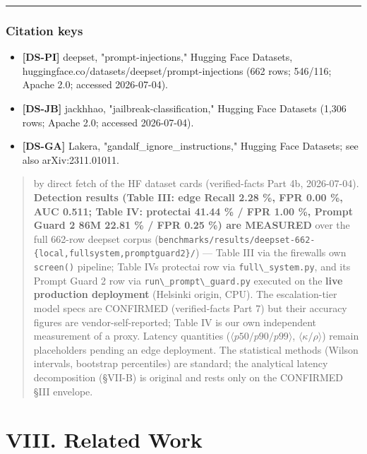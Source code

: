 \begin{center}\rule{0.5\linewidth}{0.5pt}\end{center}

\subsubsection{Citation keys}\label{citation-keys-4}

\begin{itemize}
\tightlist
\item
  \textbf{{[}DS-PI{]}} deepset, "prompt-injections," Hugging Face
  Datasets, huggingface.co/datasets/deepset/prompt-injections (662 rows;
  546/116; Apache 2.0; accessed 2026-07-04).
\item
  \textbf{{[}DS-JB{]}} jackhhao, "jailbreak-classification," Hugging
  Face Datasets (1,306 rows; Apache 2.0; accessed 2026-07-04).
\item
  \textbf{{[}DS-GA{]}} Lakera, "gandalf\_ignore\_instructions," Hugging
  Face Datasets; see also arXiv:2311.01011.
\end{itemize}

\begin{quote}
by direct fetch of the HF dataset cards (verified-facts Part 4b,
2026-07-04). \textbf{Detection results (Table III: edge Recall 2.28 \%,
FPR 0.00 \%, AUC 0.511; Table IV: protectai 41.44 \% / FPR 1.00 \%,
Prompt Guard 2 86M 22.81 \% / FPR 0.25 \%) are MEASURED} over the full
662-row deepset corpus
(\passthrough{\lstinline!benchmarks/results/deepset-662-\{local,fullsystem,promptguard2\}/!})
--- Table III via the firewall\textquotesingle s own
\passthrough{\lstinline!screen()!} pipeline; Table IV\textquotesingle s
protectai row via \passthrough{\lstinline!full\_system.py!}, and its
Prompt Guard 2 row via \passthrough{\lstinline!run\_prompt\_guard.py!}
executed on the \textbf{live production deployment} (Helsinki origin,
CPU). The escalation-tier model specs are CONFIRMED (verified-facts Part
7) but their accuracy figures are vendor-self-reported; Table IV is our
own independent measurement of a proxy. Latency quantities
(\(\langle p50/p90/p99\rangle\), \(\langle\kappa/\rho\rangle\)) remain
placeholders pending an edge deployment. The statistical methods (Wilson
intervals, bootstrap percentiles) are standard; the analytical latency
decomposition (§VII-B) is original and rests only on the CONFIRMED §III
envelope.
\end{quote}

\section{VIII. Related Work}\label{viii-related-work}

